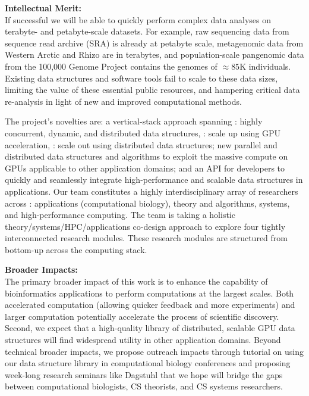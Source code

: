 \noindent \textbf{\large Intellectual Merit:}\\
If successful we will be able to quickly perform complex data analyses on
terabyte- and petabyte-scale datasets. For example, raw
sequencing data from sequence read archive (SRA) is already at petabyte scale,
metagenomic data from Western Arctic and Rhizo are in terabytes, and
population-scale pangenomic data from the 100,000 Genome Project contains the
genomes of $\approx85$K individuals. Existing data structures and software
tools fail to scale to these data sizes, limiting the value of these essential
public resources, and hampering critical data re-analysis in light of new and
improved computational methods.

The project’s novelties are: a vertical-stack approach spanning : highly concurrent, dynamic, and distributed data structures,
: scale up using GPU acceleration, : scale out using distributed data structures; new parallel and
distributed data structures and algorithms to exploit the massive compute on
GPUs applicable to other application domains; and an API for developers to
quickly and seamlessly integrate high-performance and scalable data structures
in applications.
%
Our team constitutes a highly interdisciplinary array of researchers across :
applications (computational biology), theory and algorithms, systems, and
high-performance computing. The team is taking a holistic
theory/systems/HPC/applications co-design approach to explore four tightly
interconnected research modules. These research modules are structured from
bottom-up across the computing stack.

\noindent \textbf{\large Broader Impacts: }\\
The primary broader impact of this work is to enhance the capability of
bioinformatics applications to perform computations at the largest scales. Both
accelerated computation (allowing quicker feedback and more experiments) and
larger computation potentially accelerate the process of scientific discovery.
Second, we expect that a high-quality library of distributed, scalable GPU data
structures will find widespread utility in other application domains.
%
Beyond technical broader impacts, we propose outreach impacts through tutorial
on using our data structure library in computational biology conferences and
proposing week-long research seminars like Dagstuhl that we hope will bridge
the gaps between computational biologists, CS theorists, and CS systems
researchers. 
